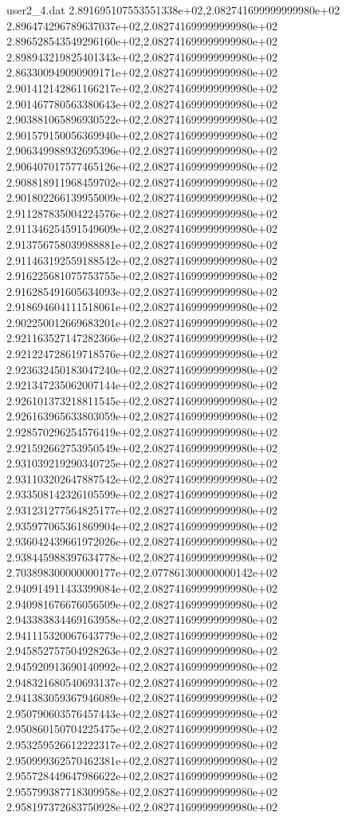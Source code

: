 \begin{filecontents}{user2_4.dat}
2.891695107553551338e+02,2.082741699999999980e+02
2.896474296789637037e+02,2.082741699999999980e+02
2.896528543549296160e+02,2.082741699999999980e+02
2.898943219825401343e+02,2.082741699999999980e+02
2.863300949090909171e+02,2.082741699999999980e+02
2.901412142861166217e+02,2.082741699999999980e+02
2.901467780563380643e+02,2.082741699999999980e+02
2.903881065896930522e+02,2.082741699999999980e+02
2.901579150056369940e+02,2.082741699999999980e+02
2.906349988932695396e+02,2.082741699999999980e+02
2.906407017577465126e+02,2.082741699999999980e+02
2.908818911968459702e+02,2.082741699999999980e+02
2.901802266139955009e+02,2.082741699999999980e+02
2.911287835004224576e+02,2.082741699999999980e+02
2.911346254591549609e+02,2.082741699999999980e+02
2.913756758039988881e+02,2.082741699999999980e+02
2.911463192559188542e+02,2.082741699999999980e+02
2.916225681075753755e+02,2.082741699999999980e+02
2.916285491605634093e+02,2.082741699999999980e+02
2.918694604111518061e+02,2.082741699999999980e+02
2.902250012669683201e+02,2.082741699999999980e+02
2.921163527147282366e+02,2.082741699999999980e+02
2.921224728619718576e+02,2.082741699999999980e+02
2.923632450183047240e+02,2.082741699999999980e+02
2.921347235062007144e+02,2.082741699999999980e+02
2.926101373218811545e+02,2.082741699999999980e+02
2.926163965633803059e+02,2.082741699999999980e+02
2.928570296254576419e+02,2.082741699999999980e+02
2.921592662753950549e+02,2.082741699999999980e+02
2.931039219290340725e+02,2.082741699999999980e+02
2.931103202647887542e+02,2.082741699999999980e+02
2.933508142326105599e+02,2.082741699999999980e+02
2.931231277564825177e+02,2.082741699999999980e+02
2.935977065361869904e+02,2.082741699999999980e+02
2.936042439661972026e+02,2.082741699999999980e+02
2.938445988397634778e+02,2.082741699999999980e+02
2.703898300000000177e+02,2.077861300000000142e+02
2.940914911433399084e+02,2.082741699999999980e+02
2.940981676676056509e+02,2.082741699999999980e+02
2.943383834469163958e+02,2.082741699999999980e+02
2.941115320067643779e+02,2.082741699999999980e+02
2.945852757504928263e+02,2.082741699999999980e+02
2.945920913690140992e+02,2.082741699999999980e+02
2.948321680540693137e+02,2.082741699999999980e+02
2.941383059367946089e+02,2.082741699999999980e+02
2.950790603576457443e+02,2.082741699999999980e+02
2.950860150704225475e+02,2.082741699999999980e+02
2.953259526612222317e+02,2.082741699999999980e+02
2.950999362570462381e+02,2.082741699999999980e+02
2.955728449647986622e+02,2.082741699999999980e+02
2.955799387718309958e+02,2.082741699999999980e+02
2.958197372683750928e+02,2.082741699999999980e+02

\end{filecontents}
